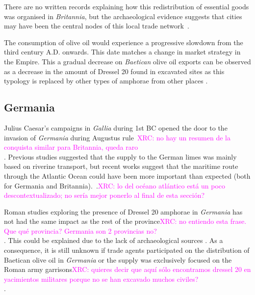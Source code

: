 \documentclass[review]{elsarticle}
\newcommand{\memo}[2]{\textcolor{#1}{#2}}
\newcommand{\xavi}[1]{\memo{magenta}{XRC: #1\\}}
\begin{document}
There are no written records explaining how this redistribution of essential goods was organised in \textit{Britannia}, but the archaeological evidence suggests that cities may have been the central nodes of this local trade network~\citep[45]{funari_economic_2005}.

The consumption of olive oil would experience a progressive slowdown from the third century A.D. onwards. This date matches a change in market strategy in the Empire. This a gradual decrease on \textit{Baetican} olive oil exports can be observed as a decrease in the amount of Dressel 20 found in excavated sites as this typology is replaced by other types of amphorae from other places \citep{rodriguez1991aceite,millet_anforas_1998}.


\subsection{Germania}

Julius Caesar's campaigns in \textit{Gallia} during 1st BC opened the door to the invasion of \textit{Germania} during Augustus rule~\citep{remesal_annona_1986,remesal_baetica_2002}\xavi{no hay un resumen de la conquista similar para Britannia, queda raro}. Previous studies suggested that the supply to the German limes was mainly based on riverine transport, but recent works suggest that the maritime route through the Atlantic Ocean could have been more important than expected (both for Germania and Britannia).~\citep{remesal_germn_2010,rubio-campillo_ecology_2018}.\xavi{lo del océano atlántico está un poco descontextualizado; no sería mejor ponerlo al final de esta sección?}

Roman studies exploring the presence of Dressel 20 amphorae in \textit{Germania} has not had the same impact as the rest of the province\xavi{no entiendo esta frase. Que qué provincia? Germania son 2 provincias no?}. This could be explained due to the lack of archaeological sources \citep{horacio2010llegada}. As a consequence, it is still unknown if trade agents participated on the distribution of Baetican olive oil in \textit{Germania} or the supply was exclusively focused on the Roman army garrisons\citep[156]{remesal_germn_2010}\xavi{quieres decir que aquí sólo encontramos dressel 20 en yacimientos militares porque no se han excavado muchos civiles?}. 
\end{document}
